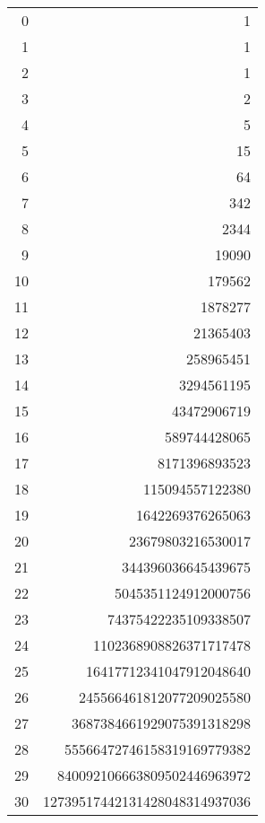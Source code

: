 \documentclass[distribution,draft]{brandiss} %
\numberwithin{section}{chapter}
\numberwithin{figure}{chapter}
\begin{document}
\begin{table}[htb]
{\begin{tabular}{r | r}
      0 & 1 \\
      1 & 1 \\
      2 & 1 \\
      3 & 2 \\
      4 & 5 \\
      5 & 15 \\
      6 & 64 \\
      7 & 342 \\
      8 & 2344 \\
      9 & 19090 \\
      10 & 179562 \\
      11 & 1878277 \\
      12 & 21365403 \\
      13 & 258965451 \\
      14 & 3294561195 \\
      15 & 43472906719 \\
      16 & 589744428065 \\
      17 & 8171396893523 \\
      18 & 115094557122380 \\
      19 & 1642269376265063 \\
      20 & 23679803216530017 \\
      21 & 344396036645439675 \\
      22 & 5045351124912000756 \\
      23 & 74375422235109338507 \\
      24 & 1102368908826371717478 \\
      25 & 16417712341047912048640 \\
      26 & 245566461812077209025580 \\
      27 & 3687384661929075391318298 \\
      28 & 55566472746158319169779382 \\
      29 & 840092106663809502446963972 \\
      30 & 12739517442131428048314937036
    \end{tabular}
  }
\end{table}
\end{document}
